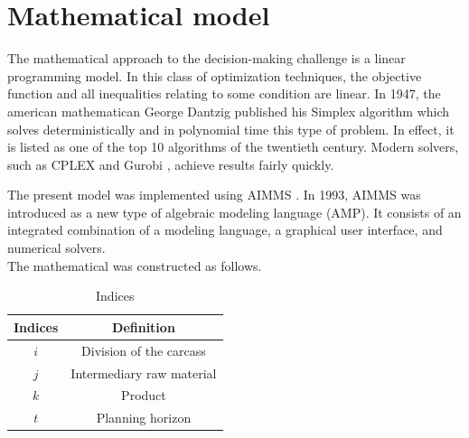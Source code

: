 \documentclass[a4paper,12pt]{article}
\begin{document}
\section{Mathematical model}

The mathematical approach to the decision-making challenge is a linear programming model. In this class of optimization techniques, the objective function and all inequalities relating to some condition are linear. In 1947, the american mathematican George Dantzig published his Simplex algorithm which solves deterministically and in polynomial time this type of problem. In effect, it is listed as one of the top 10 algorithms of the twentieth century. Modern solvers, such as CPLEX \cite{cplex} and Gurobi \cite{gurobi}, achieve results fairly quickly.

The present model was implemented using AIMMS \cite{aimms}. In 1993, AIMMS was introduced as a new type of algebraic modeling language (AMP). It consists of an integrated combination of a modeling language, a graphical user interface, and numerical solvers.\\

The mathematical was constructed as follows. 

\begin{table}[H]
\centering
\begin{tabular}{|c|c|}
\hline
\textbf{Indices} & \textbf{Definition} \\
\hline 
 $i$ & Division of the carcass \\
\hline
 $j$  & Intermediary raw material \\
\hline
 $k$  & Product \\
 \hline
 $t$  & Planning horizon \\
 \hline
\end{tabular}
\caption{Indices}
\label{tab:indices}
\end{table}
\end{document}
